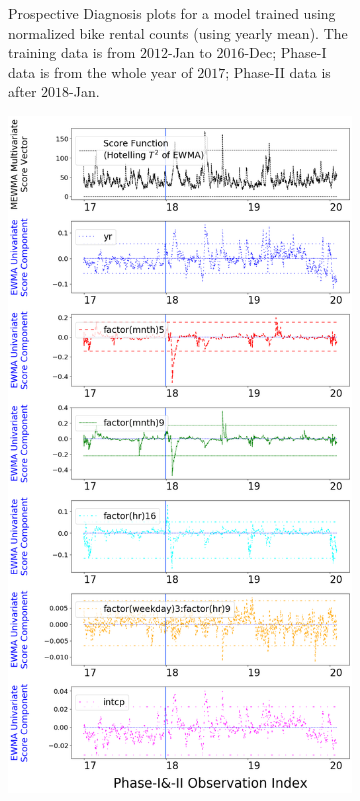 \documentclass[twoside,11pt]{article}
\begin{document}
\begin{enumerate}
\begin{figure}[H]
\begin{subfigure}[t]{0.32\linewidth}
     \captionsetup{width=.95\linewidth}
     \caption{Prospective Diagnosis plots for a model trained using normalized bike rental counts (using yearly mean). The training data is from $2012$-Jan to $2016$-Dec; Phase-I data is from the whole year of $2017$; Phase-II data is after $2018$-Jan.}
     \label{fig:bs_raw_cnt_1}
\end{subfigure}
\begin{subfigure}[t]{0.32\linewidth}
     \centering
         \includegraphics[width=1.0\textwidth, trim=.0in .0in .0in .0in, clip]{../figures/v14/bike_sharing/reg_lin_D_2/neg_single_bike_fisher_mlines_with_regu_1e-08_0_0001_0_01_99_99.png}

\end{subfigure}
\end{figure}
\end{enumerate}
\end{document}
